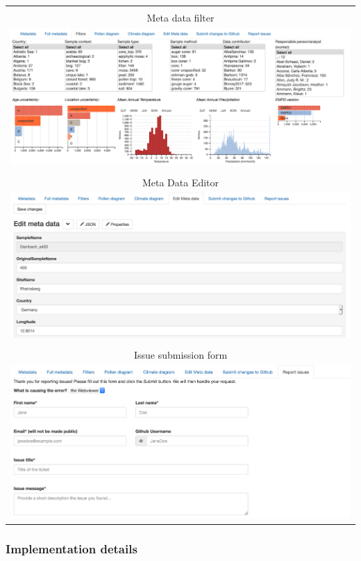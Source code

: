 \begin{refsection}
{\begin{longtable}{c}
		\newpage \\
		\hline
		\tabularnewline
		Meta data filter \\
		\includegraphics[width=\linewidth]{empd-figures/filter.png} \\
		\hline
		\tabularnewline
		Meta Data Editor \\
		\includegraphics[width=\linewidth]{empd-figures/meta-data-editor.png} \\
		\hline
		\tabularnewline
		Issue submission form \\
		\includegraphics[width=\linewidth]{empd-figures/issue-report.png} \\
		\hline\hline
	\end{longtable}
}

\subsubsection{Implementation details}


\end{refsection}
